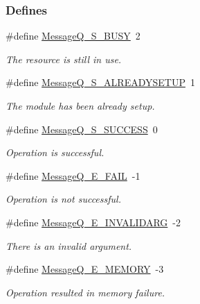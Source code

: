 \subsubsection*{Defines}
\begin{DoxyCompactItemize}
\item 
\#define \hyperlink{_message_q_8h_aaccc1e5cf87160e123d1eee033d2ad75}{MessageQ\_\-S\_\-BUSY}~2
\begin{DoxyCompactList}\small\item\em The resource is still in use. \item\end{DoxyCompactList}\item 
\#define \hyperlink{_message_q_8h_ae4bc8b4de93c57b77110dc473b16108f}{MessageQ\_\-S\_\-ALREADYSETUP}~1
\begin{DoxyCompactList}\small\item\em The module has been already setup. \item\end{DoxyCompactList}\item 
\#define \hyperlink{_message_q_8h_a1643901e74764002f880ccc408691de6}{MessageQ\_\-S\_\-SUCCESS}~0
\begin{DoxyCompactList}\small\item\em Operation is successful. \item\end{DoxyCompactList}\item 
\#define \hyperlink{_message_q_8h_a19b5749722c26050d2e56c2104f982fe}{MessageQ\_\-E\_\-FAIL}~-\/1
\begin{DoxyCompactList}\small\item\em Operation is not successful. \item\end{DoxyCompactList}\item 
\#define \hyperlink{_message_q_8h_a1855a3c9b16a1fff0e24b82beaa3dd58}{MessageQ\_\-E\_\-INVALIDARG}~-\/2
\begin{DoxyCompactList}\small\item\em There is an invalid argument. \item\end{DoxyCompactList}\item 
\#define \hyperlink{_message_q_8h_a1205c1ab4a71a4850d836ff6aa6bbfeb}{MessageQ\_\-E\_\-MEMORY}~-\/3
\begin{DoxyCompactList}\small\item\em Operation resulted in memory failure. \item\end{DoxyCompactList}\item 

\end{DoxyCompactItemize}
